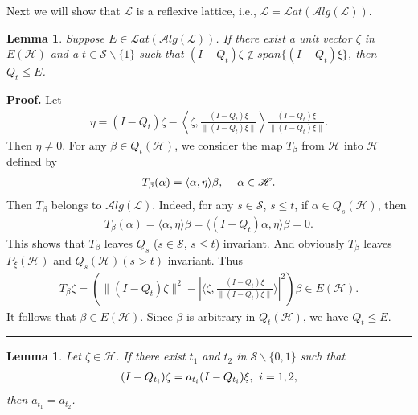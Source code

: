 \documentclass[12pt]{article}
\newtheorem{lemma}[theorem]{Lemma}
\newenvironment{proof}[1][Proof]{\textbf{#1.} }{\ \rule{0.5em}{0.5em}}
\def\Lat{{\mathcal Lat}}\def\Alg{{\mathcal Alg}}
\newcommand{\HHH}{\mathscr H} %
\newcommand{\LLL}{\mathscr L} %
\newcommand{\SSS}{\mathcal S}
\newcommand{\PP}[1]{ P_{#1}} %
\newcommand{\QQ}[1]{ Q_{#1}}
\def\Lat{\mathcal Lat}
\def\Alg{\mathcal Alg}
\begin{document}
Next we will show that $\LLL$ is a reflexive lattice, i.e., $\LLL =
\Lat(\Alg(\LLL))$.

\begin{lemma}
Suppose $E \in \Lat(\Alg(\LLL))$. If there exist a unit vector
$\zeta$ in $E(\HHH)$ and a $t\in \SSS\backslash \{1\}$ such that
 $(I - \QQ {t}) \zeta \notin span\{ (I
- \QQ {t}) \xi \}$, then $\QQ {t} \leq E$.
\end{lemma}

\noindent\begin{proof} Let
\begin{align*}
\eta = (I - \QQ {t}) \zeta - \left\langle\zeta, \frac{(I - \QQ
{t})\xi}{\|(I - \QQ {t}) \xi \|}\right\rangle\frac{(I - \QQ
{t})\xi}{\|(I - \QQ {t}) \xi \|}.
\end{align*} Then $\eta\neq 0$. For any $\beta \in \QQ {t} (\HHH)$,
we consider the map $T_{\beta}$ from $\HHH$ into $\HHH$ defined by
\begin{align*}
T_{\beta} (\alpha)=\langle \alpha, \eta\rangle \beta, \hskip12pt
\alpha\in \HHH.
\end{align*}
Then $T_{\beta}$ belongs to $\Alg(\LLL)$. Indeed, for any $s \in
\SSS$, $ s \leq t$, if $\alpha \in \QQ {s}( \HHH)$, then
\begin{align*}
T_{\beta}( \alpha) = \langle \alpha, \eta\rangle \beta = \langle(I-
\QQ {t}) \alpha, \eta\rangle \beta = 0.
\end{align*} This shows that $T_{\beta}$ leaves $\QQ {s}$ ($s\in \SSS$, $s\leq t$) invariant.
And obviously $T_{\beta}$ leaves $\PP {\xi}(\HHH)$ and $\QQ
{s}(\HHH) (s
> t)$ invariant. Thus
\begin{align*}
T_{\beta}\zeta = \left(\|(I- \QQ {t})\zeta \|^{2} - |\langle \zeta,
\frac{(I - \QQ {t})\xi}{\|(I - \QQ {t}) \xi \|}\rangle
|^{2}\right)\beta \in E (\HHH).
\end{align*} It follows that $\beta\in E(\HHH)$.
Since $\beta$ is arbitrary in $\QQ {t}(\HHH)$, we have $\QQ {t} \leq
E$.
\end{proof}

\begin{lemma}
Let $\zeta \in \HHH$. If there exist $t_1$ and $ t_2 $ in
$\SSS\backslash \{0, 1\}$ such that
\begin{align*}
(I - \QQ {t_i}) \zeta = a_{t_i}(I - \QQ {t_i})\xi,\hskip4pt  i = 1,
2,
\end{align*}
then $a_{t_1}=a_{t_2}$.
\end{lemma}
\end{document}
